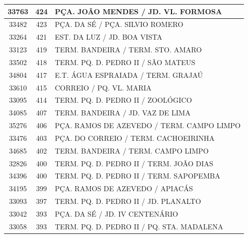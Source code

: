 \documentclass[
	12pt,				%
	oneside,			%
	a4paper,			%
	english,			%
	brazil				%
	]{abntex2ppgsi}
\begin{document}
\begin{apendicesenv}
\begin{longtable}{c|c|p{7cm}}
    33763 & 424   & PÇA. JOÃO MENDES / JD. VL. FORMOSA \\
\hline

    33482 & 423   & PÇA. DA SÉ / PÇA. SILVIO ROMERO \\
\hline

    33264 & 421   & EST. DA LUZ / JD. BOA VISTA \\
\hline

    33123 & 419   & TERM. BANDEIRA / TERM. STO. AMARO \\
\hline

    33502 & 418   & TERM. PQ. D. PEDRO II / SÃO MATEUS \\
\hline

    34804 & 417   & E.T. ÁGUA ESPRAIADA / TERM. GRAJAÚ \\
\hline

    33610 & 415   & CORREIO / PQ. VL. MARIA \\
\hline

    33095 & 414   & TERM. PQ. D. PEDRO II / ZOOLÓGICO \\
\hline

    34085 & 407   & TERM. BANDEIRA / JD. VAZ DE LIMA \\
\hline

    35276 & 406   & PÇA. RAMOS DE AZEVEDO / TERM. CAMPO LIMPO \\
\hline

    33476 & 403   & PÇA. DO CORREIO / TERM. CACHOEIRINHA \\
\hline

    34685 & 402   & TERM. BANDEIRA / TERM. CAMPO LIMPO \\
\hline

    32826 & 400   & TERM. PQ. D. PEDRO II / TERM. JOÃO DIAS \\
\hline

    34396 & 400   & TERM. PQ. D. PEDRO II / TERM. SAPOPEMBA \\
\hline

    34195 & 399   & PÇA. RAMOS DE AZEVEDO / APIACÁS \\
\hline

    33093 & 397   & TERM. PQ. D. PEDRO II / JD. PLANALTO \\
\hline

    33042 & 393   & PÇA. DA SÉ / JD. IV CENTENÁRIO \\
\hline

    33058 & 393   & TERM. PQ. D. PEDRO II / PQ. STA. MADALENA \\
\hline


\end{longtable}
\end{apendicesenv}
\end{document}
